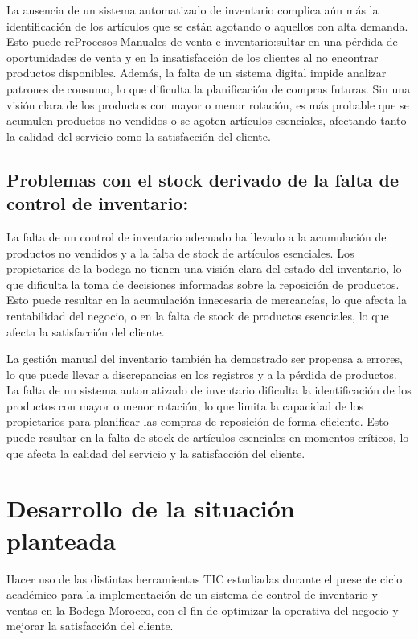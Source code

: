 \documentclass{article}
\begin{document}
  La ausencia de un sistema automatizado de inventario complica aún más la identificación de los artículos que se están agotando o aquellos con alta demanda. Esto puede reProcesos Manuales de venta e inventario:sultar en una pérdida de oportunidades de venta y en la insatisfacción de los clientes al no encontrar productos disponibles. Además, la falta de un sistema digital impide analizar patrones de consumo, lo que dificulta la planificación de compras futuras. Sin una visión clara de los productos con mayor o menor rotación, es más probable que se acumulen productos no vendidos o se agoten artículos esenciales, afectando tanto la calidad del servicio como la satisfacción del cliente.

  \subsection{Problemas con el stock derivado de la falta de control de inventario:}

  La falta de un control de inventario adecuado ha llevado a la acumulación de productos no vendidos y a la falta de stock de artículos esenciales. Los propietarios de la bodega no tienen una visión clara del estado del inventario, lo que dificulta la toma de decisiones informadas sobre la reposición de productos. Esto puede resultar en la acumulación innecesaria de mercancías, lo que afecta la rentabilidad del negocio, o en la falta de stock de productos esenciales, lo que afecta la satisfacción del cliente.

  La gestión manual del inventario también ha demostrado ser propensa a errores, lo que puede llevar a discrepancias en los registros y a la pérdida de productos. La falta de un sistema automatizado de inventario dificulta la identificación de los productos con mayor o menor rotación, lo que limita la capacidad de los propietarios para planificar las compras de reposición de forma eficiente. Esto puede resultar en la falta de stock de artículos esenciales en momentos críticos, lo que afecta la calidad del servicio y la satisfacción del cliente.

\newpage

\section{Desarrollo de la situación planteada}
    
    Hacer uso de las distintas herramientas TIC estudiadas durante el presente ciclo académico para la implementación de un sistema de control de inventario y ventas en la Bodega Morocco, con el fin de optimizar la operativa del negocio y mejorar la satisfacción del cliente.
\end{document}
